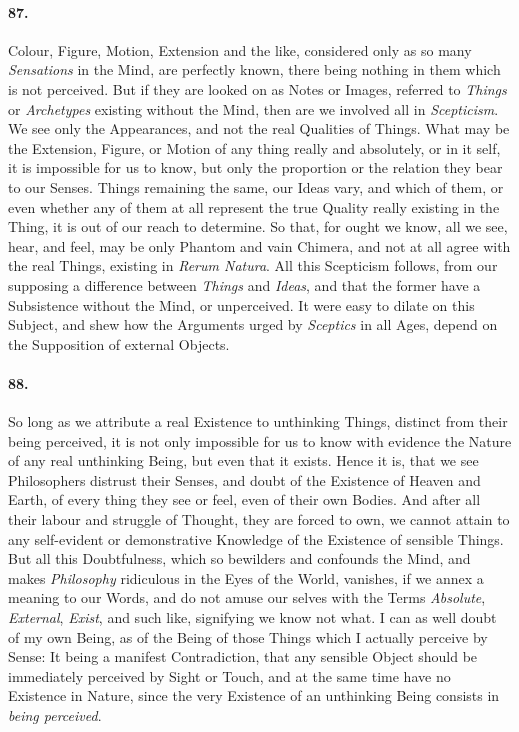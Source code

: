 \documentclass[]{article}
\newenvironment{sectionbody}{}{}
\begin{document}
\begin{sectionbody}
\paragraph{87.} Colour, Figure, Motion, Extension and the like, considered only
as so many \emph{Sensations} in the Mind, are perfectly known,
there being nothing in them which is not perceived.  But if they
are looked on as Notes or Images, referred to \emph{Things} or
\emph{Archetypes} existing without the Mind, then are we
involved all in \emph{Scepticism}.  We see only the
Appearances, and not the real Qualities of Things.  What may be
the Extension, Figure, or Motion of any thing really and
absolutely, or in it self, it is impossible for us to know, but
only the proportion or the relation they bear to our Senses.
Things remaining the same, our Ideas vary, and which of them, or
even whether any of them at all represent the true Quality really
existing in the Thing, it is out of our reach to determine.  So
that, for ought we know, all we see, hear, and feel, may be only
Phantom and vain Chimera, and not at all agree with the real
Things, existing in \emph{Rerum Natura}.  All this Scepticism
follows, from our supposing a difference between \emph{Things}
and \emph{Ideas}, and that the former have a Subsistence
without the Mind, or unperceived.  It were easy to dilate on this
Subject, and shew how the Arguments urged by \emph{Sceptics} in
all Ages, depend on the Supposition of external Objects.



\paragraph{88.} So long as we attribute a real Existence to unthinking Things,
distinct from their being perceived, it is not only impossible
for us to know with evidence the Nature of any real unthinking
Being, but even that it exists.  Hence it is, that we see
Philosophers distrust their Senses, and doubt of the Existence of
Heaven and Earth, of every thing they see or feel, even of their
own Bodies.  And after all their labour and struggle of Thought,
they are forced to own, we cannot attain to any self-evident or
demonstrative Knowledge of the Existence of sensible Things.  But
all this Doubtfulness, which so bewilders and confounds the Mind,
and makes \emph{Philosophy} ridiculous in the Eyes of the
World, vanishes, if we annex a meaning to our Words, and do not
amuse our selves with the Terms \emph{Absolute},
\emph{External}, \emph{Exist}, and such like, signifying we
know not what.  I can as well doubt of my own Being, as of the
Being of those Things which I actually perceive by Sense: It
being a manifest Contradiction, that any sensible Object should
be immediately perceived by Sight or Touch, and at the same time
have no Existence in Nature, since the very Existence of
an unthinking Being consists in \emph{being perceived}.




\end{sectionbody}
\end{document}
